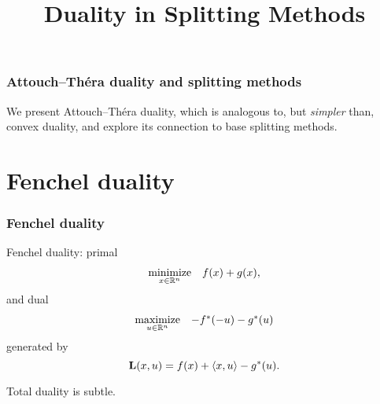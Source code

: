 \documentclass[10pt,mathserif]{beamer}
\title{\large \bfseries Duality in Splitting Methods}
\begin{document}
\frame{
\thispagestyle{empty}
\titlepage
}


\begin{frame}
\frametitle{Attouch--Th\'era duality and splitting methods}

We present Attouch--Th\'era duality, which is analogous to, but \emph{simpler} than, convex duality,
and explore its connection to base splitting methods.

%
%

\end{frame}



\section{Fenchel duality}
\begin{frame}
\frametitle{Fenchel duality}
Fenchel duality: primal
\[
\begin{array}{ll}
\underset{x\in\mathbb{R}^n}{\mathrm{minimize}} &
f(x)+g(x),
\end{array}
\label{eq:fenchelP}
\]
and dual
\[\begin{array}{ll}
\underset{u \in\mathbb{R}^n}{\mathrm{maximize}} &
-f^*(-u )-g^*(u )
\end{array}
\label{eq:fenchelD}
\]
generated by 
\[
\mathbf{L}(x,u )=f(x)+\langle x,u \rangle-g^*(u ).
\]
\vspace{0.2in}

Total duality is subtle.
\end{frame}
\end{document}
